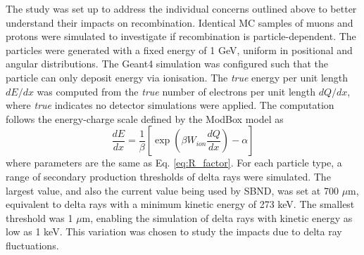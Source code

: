 The study was set up to address the individual concerns outlined above to better understand their impacts on recombination.
Identical MC samples of muons and protons were simulated to investigate if recombination is particle-dependent.
The particles were generated with a fixed energy of 1 GeV, uniform in positional and angular distributions.
The Geant4 simulation was configured such that the particle can only deposit energy via ionisation.
The \textit{true} energy per unit length $dE/dx$ was computed from the \textit{true} number of electrons per unit length $dQ/dx$, where \textit{true} indicates no detector simulations were applied. 
The computation follows the energy-charge scale defined by the ModBox model as \cite{argoneut_recomb}
\begin{equation}
        \label{eq:recomb_modbox}
        \frac{dE}{dx} = \frac{1}{\beta}\left[ \exp{\left( \beta W_{ion}  \frac{dQ}{dx}\right)} -\alpha \right]
\end{equation}
where parameters are the same as Eq. \ref{eq:R_factor}.
For each particle type, a range of secondary production thresholds of delta rays were simulated.
The largest value, and also the current value being used by SBND, was set at 700 $\mu$m, equivalent to delta rays with a minimum kinetic energy of 273 keV.
The smallest threshold was 1 $\mu$m, enabling the simulation of delta rays with kinetic energy as low as 1 keV.
This variation was chosen to study the impacts due to delta ray fluctuations.


%

